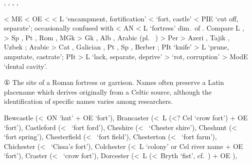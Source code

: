 \documentclass[12pt,letterpaper,oneside,article,draft]{memoir}
\begin{document}
\begin{Lemma}
\begin{Also}
	, , , , 
\end{Also}
\begin{Etymology}
	< ME  < OE  < 
			< L  ‘encampment, fortification’ <  ‘fort, castle’
			< PIE  ‘cut off, separate’; occasionally confused with 
			< AN  < L  ‘fortress’ dim.\ of .
	Compare
	L ,  > Sp , Pt , Rom ,
		MGk   > Gk  ,
		Alb ,
		Arabic \hspace*{-0.5ex}  (pl.\ \hspace*{-0.5ex}‎ ) >
			Per \hspace*{-0.5ex}  > Azeri ,
				Tajik  \fm{qasr}, Uzbek ;
		Arabic \hspace*{-0.5ex}  > Cat , Galician ,
			Pt , Sp , Berber ;
	PIt  ‘knife’ > L  ‘prune, amputate, castrate’;
	PIt  > L  ‘lack, separate, deprive’ >  ‘rot, corruption’ >
		ModE  ‘dental cavity’.
\end{Etymology}
\begin{Definitions}
	① The site of a Roman fortress or garrison. Names often preserve a Latin placename which derives originally from a Celtic source, although the identification of specific names varies among researchers.
\end{Definitions}
\begin{Examples}
	Bewcastle (<~ON  ‘hut’ + OE  ‘fort’),
	Brancaster (<~L  (<? Cel ‘crow fort’) + OE  ‘fort’),
	Castleford (<~ ‘fort ford’),
	Cheshire (<~ ‘Chester shire’),
	Cheshunt (<~ ‘fort spring’),
	Chesterfield (<~ ‘fort field’),
	Chesterton (<~ ‘fort farm’),
	Chichester (<~ ‘Cissa’s fort’),
	Colchester (<~L  ‘colony’ or Cel river name  + OE  ‘fort’),
	Craster (<~ ‘crow fort’),
	Dorcester (<~L  (<~Bryth  ‘fist’, cf.\ ) + OE ),

\end{Examples}
\end{Lemma}
\end{document}
